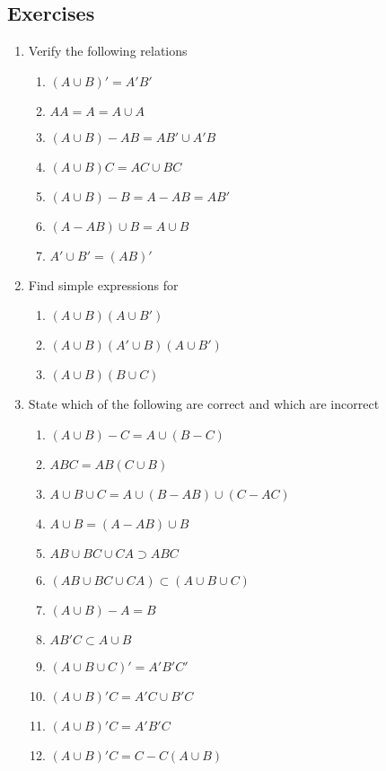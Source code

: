 \documentclass[../main.tex]{subfiles}
\begin{document}
\subsection{Exercises}
\begin{enumerate}
	\item Verify the following relations
	\begin{enumerate}
		\item $(A \cup B)' = A'B'$
		\item $AA = A = A \cup A$
		\item $(A \cup B) - AB = AB' \cup A'B$
		\item $(A \cup B)C = AC \cup BC$
		\item $(A \cup B) - B = A - AB = AB'$
		\item $(A - AB) \cup B = A \cup B$
		\item $A' \cup B' = (AB)'$
	\end{enumerate}

	\item Find simple expressions for
	\begin{enumerate}
		\item $(A \cup B)(A \cup B')$
		\item $(A \cup B)(A' \cup B)(A \cup B')$
		\item $(A \cup B)(B \cup C)$
	\end{enumerate}

	\item State which of the following are correct and which
	are incorrect
	\begin{enumerate}
		\item $(A \cup B) - C = A \cup (B-C)$
		\item $ABC = AB(C \cup B)$
		\item $A \cup B \cup C = A \cup (B-AB) \cup (C-AC)$
		\item $A \cup B = (A-AB) \cup B$
		\item $AB \cup BC \cup CA \supset ABC$
		\item $(AB \cup BC \cup CA) \subset (A \cup B \cup C)$
		\item $(A \cup B) - A = B$
		\item $AB'C \subset A \cup B$
		\item $(A \cup B \cup C)' = A'B'C'$
		\item $(A \cup B)'C = A'C \cup B'C$
		\item $(A \cup B)'C = A'B'C$
		\item $(A \cup B)'C = C - C(A \cup B)$
	\end{enumerate}


\end{enumerate}
\end{document}
